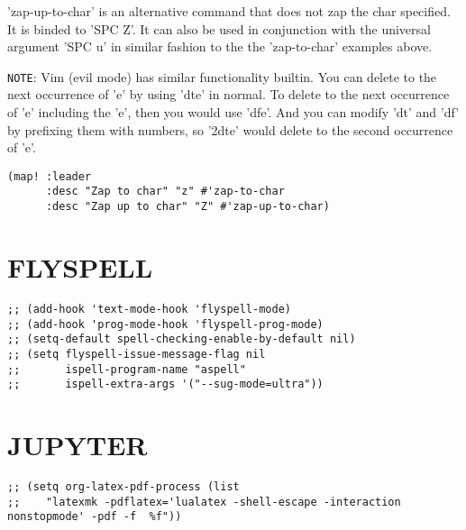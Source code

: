 \documentclass[11pt]{article}
\begin{document}
'zap-up-to-char' is an alternative command that does not zap the char specified.  It is binded to 'SPC Z'.  It can also be used in conjunction with the universal argument 'SPC u' in similar fashion to the the 'zap-to-char' examples above.

\texttt{NOTE}:  Vim (evil mode) has similar functionality builtin.  You can delete to the next occurrence of 'e' by using 'dte' in normal.  To delete to the next occurrence of 'e' including the 'e', then you would use 'dfe'.  And you can modify 'dt' and 'df' by prefixing them with numbers, so '2dte' would delete to the second occurrence of 'e'.

\begin{verbatim}
(map! :leader
      :desc "Zap to char" "z" #'zap-to-char
      :desc "Zap up to char" "Z" #'zap-up-to-char)
\end{verbatim}

\section{FLYSPELL}
\label{sec:orgc609170}
\begin{verbatim}
;; (add-hook 'text-mode-hook 'flyspell-mode)
;; (add-hook 'prog-mode-hook 'flyspell-prog-mode)
;; (setq-default spell-checking-enable-by-default nil)
;; (setq flyspell-issue-message-flag nil
;;       ispell-program-name "aspell"
;;       ispell-extra-args '("--sug-mode=ultra"))
\end{verbatim}

\section{JUPYTER}
\label{sec:orgcfa3b94}
\begin{verbatim}
;; (setq org-latex-pdf-process (list
;;    "latexmk -pdflatex='lualatex -shell-escape -interaction nonstopmode' -pdf -f  %f"))
\end{verbatim}
\end{document}

